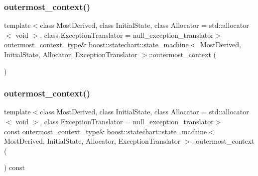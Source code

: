 \mbox{\label{classboost_1_1statechart_1_1state__machine_a937f603c12a217efe19ce49f536b254d}} 
\subsubsection{\texorpdfstring{outermost\+\_\+context()}{outermost\_context()}\hspace{0.1cm}{\footnotesize\ttfamily [1/2]}}
{\footnotesize\ttfamily template$<$class Most\+Derived, class Initial\+State, class Allocator = std\+::allocator$<$ void $>$, class Exception\+Translator = null\+\_\+exception\+\_\+translator$>$ \\
\mbox{\hyperlink{classboost_1_1statechart_1_1state__machine_a3c047829e797a9501c7d69151d17e368}{outermost\+\_\+context\+\_\+type}}\& \mbox{\hyperlink{classboost_1_1statechart_1_1state__machine}{boost\+::statechart\+::state\+\_\+machine}}$<$ Most\+Derived, Initial\+State, Allocator, Exception\+Translator $>$\+::outermost\+\_\+context (\begin{DoxyParamCaption}{ }\end{DoxyParamCaption})\hspace{0.3cm}{\ttfamily [inline]}}

\mbox{\label{classboost_1_1statechart_1_1state__machine_a882a09cb2b9013e63780ac7bf12b9e2a}} 
\subsubsection{\texorpdfstring{outermost\+\_\+context()}{outermost\_context()}\hspace{0.1cm}{\footnotesize\ttfamily [2/2]}}
{\footnotesize\ttfamily template$<$class Most\+Derived, class Initial\+State, class Allocator = std\+::allocator$<$ void $>$, class Exception\+Translator = null\+\_\+exception\+\_\+translator$>$ \\
const \mbox{\hyperlink{classboost_1_1statechart_1_1state__machine_a3c047829e797a9501c7d69151d17e368}{outermost\+\_\+context\+\_\+type}}\& \mbox{\hyperlink{classboost_1_1statechart_1_1state__machine}{boost\+::statechart\+::state\+\_\+machine}}$<$ Most\+Derived, Initial\+State, Allocator, Exception\+Translator $>$\+::outermost\+\_\+context (\begin{DoxyParamCaption}{ }\end{DoxyParamCaption}) const\hspace{0.3cm}{\ttfamily [inline]}}

